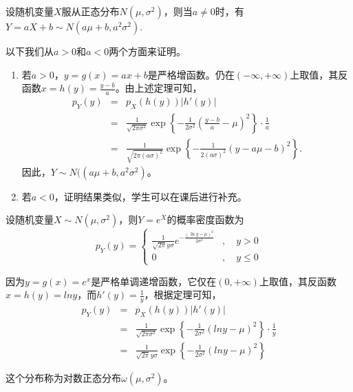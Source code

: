     \begin{note}
        \vspace{5cm}
    \end{note}
\begin{example}
    设随机变量$X$服从正态分布$N(\mu ,\sigma^{2})$，则当$a \neq 0$时，有$Y=aX+b\sim N(a\mu+b,a^{2}\sigma^{2})$.
\end{example}
\begin{solution} 以下我们从$a>0$和$a<0$两个方面来证明。
    \begin{enumerate}
        \item 若$a>0$，$y=g(x)=ax+b$是严格增函数。仍在$(-\infty,+\infty)$上取值，其反函数$x=h(y)=\frac{y-b}{a}$。由上述定理可知，
        \begin{eqnarray*}
            p_{Y}(y)&=&p_{X}\left ( h(y) \right )\left | h'(y) \right |  \\
            &=&\frac{1}{\sqrt{2\pi \sigma ^{2}} } \exp\left\{-\frac{1}{2\sigma ^{2}}(\frac{y-b}{a} -\mu)^{2} \right\}\cdot \frac{1}{a} \\
            &=&  \frac{1}{\sqrt{2\pi (a\sigma )^{2}} } \exp\left\{-\frac{1}{2(a\sigma) ^{2}}(y-a\mu-b)^{2} \right\}.
        \end{eqnarray*}
    因此，$Y\sim N((a\mu+b,a^{2}\sigma^{2})$。
    \item 若$a<0$，证明结果类似，学生可以在课后进行补充。
    \begin{note}
        \vspace{5cm}
    \end{note}
    \end{enumerate}
\end{solution}

\begin{example}
    设随机变量$X\sim N(\mu,\sigma^{2})$，则$Y=e^{X}$的概率密度函数为
    $$p_{Y}(y)=\left\{\begin{matrix}
    \frac{1}{\sqrt{2 \pi} y \sigma} e ^{ -\frac{(\ln y-\mu)^{2}}{2 \sigma^{2}} } &, \quad y>0 \\
    0&, \quad y \leqslant 0
    \end{matrix}\right.$$
\end{example}
\begin{solution}因为$y=g(x)=e^{x}$是严格单调递增函数，它仅在$(0,+\infty)$上取值，其反函数$x=h(y)=lny$，而$h'(y)=\frac{1}{y}$，根据定理可知，
\begin{eqnarray*}
    p_{Y}(y)&=&p_{X}\left ( h(y) \right )\left | h'(y) \right |  \\
    &=&\frac{1}{\sqrt{2\pi \sigma ^{2}} } \exp\left\{-\frac{1}{2\sigma ^{2}}(lny -\mu)^{2} \right\}\cdot \frac{1}{y} \\
    &=&\frac{1}{\sqrt{2\pi }y\sigma  } \exp\left\{-\frac{1}{2\sigma ^{2}}(lny -\mu)^{2}  \right\}
\end{eqnarray*}
\end{solution}
\begin{remark}
 这个分布称为对数正态分布$\omega \left(\mu, \sigma^{2}\right)$。
    \end{remark}

